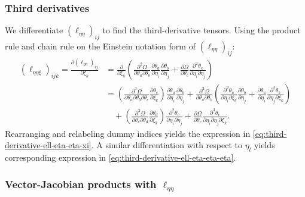 \documentclass{article}
\begin{document}
\subsubsection{Third derivatives}

We differentiate $(\ell_{\eta\eta})_{ij}$ to find the third-derivative tensors.
Using the product rule and chain rule on the Einstein notation form of $(\ell_{\eta\eta})_{ij}$:
%
\begin{align}
  (\ell_{\eta\eta\xi})_{ijk} = \frac{\partial (\ell_{\eta\eta})_{ij}}{\partial \xi_k} & = \frac{\partial}{\partial \xi_k} \left( \frac{\partial^2 \Omega}{\partial \theta_a \partial \theta_b} \frac{\partial \theta_a}{\partial \eta_i} \frac{\partial \theta_b}{\partial \eta_j} + \frac{\partial \Omega}{\partial \theta_c} \frac{\partial^2 \theta_c}{\partial \eta_i \partial \eta_j} \right)                                                                                                                                                                                                               \\
                                                                                      & = \left( \frac{\partial^3 \Omega}{\partial \theta_a \partial \theta_b \partial \theta_c} \frac{\partial \theta_c}{\partial \xi_k} \right) \frac{\partial \theta_a}{\partial \eta_i} \frac{\partial \theta_b}{\partial \eta_j} + \frac{\partial^2 \Omega}{\partial \theta_a \partial \theta_b} \left( \frac{\partial^2 \theta_a}{\partial \eta_i \partial \xi_k} \frac{\partial \theta_b}{\partial \eta_j} + \frac{\partial \theta_a}{\partial \eta_i} \frac{\partial^2 \theta_b}{\partial \eta_j \partial \xi_k} \right) \\
                                                                                      & \quad + \left( \frac{\partial^2 \Omega}{\partial \theta_c \partial \theta_d} \frac{\partial \theta_d}{\partial \xi_k} \right) \frac{\partial^2 \theta_c}{\partial \eta_i \partial \eta_j} + \frac{\partial \Omega}{\partial \theta_c} \frac{\partial^3 \theta_c}{\partial \eta_i \partial \eta_j \partial \xi_k}.
\end{align}
%
Rearranging and relabeling dummy indices yields the expression in \cref{eq:third-derivative-ell-eta-eta-xi}.
A similar differentiation with respect to $\eta_l$ yields corresponding expression in \cref{eq:third-derivative-ell-eta-eta-eta}.

\subsubsection{Vector-Jacobian products with $\ell_{\eta\eta}$}
\end{document}
